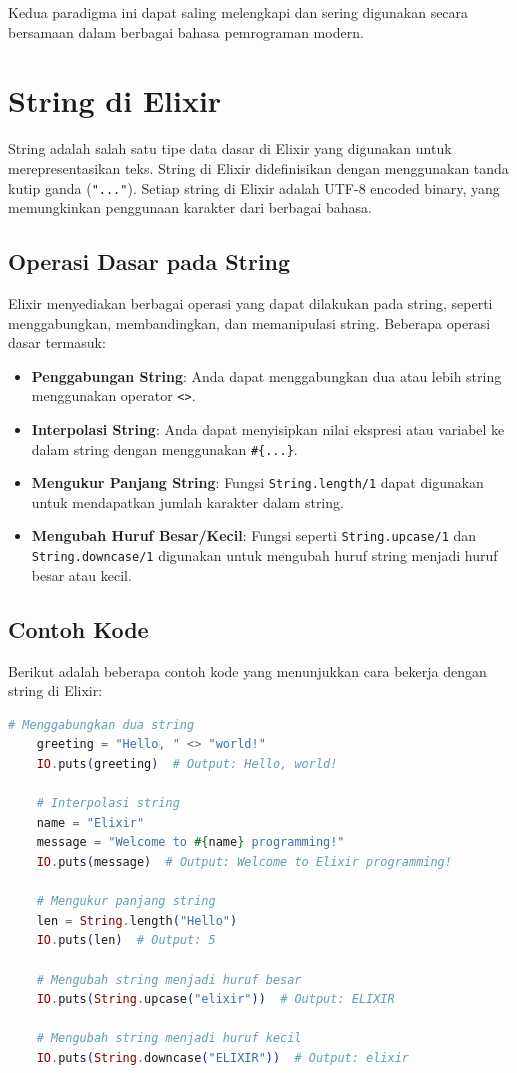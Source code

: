 Kedua paradigma ini dapat saling melengkapi dan sering digunakan secara bersamaan dalam berbagai bahasa pemrograman modern.





\section{String di Elixir}

String adalah salah satu tipe data dasar di Elixir yang digunakan untuk merepresentasikan teks. String di Elixir didefinisikan dengan menggunakan tanda kutip ganda (\texttt{"..."}). Setiap string di Elixir adalah UTF-8 encoded binary, yang memungkinkan penggunaan karakter dari berbagai bahasa.

\subsection{Operasi Dasar pada String}

Elixir menyediakan berbagai operasi yang dapat dilakukan pada string, seperti menggabungkan, membandingkan, dan memanipulasi string. Beberapa operasi dasar termasuk:

\begin{itemize}
	\item \textbf{Penggabungan String}: Anda dapat menggabungkan dua atau lebih string menggunakan operator \texttt{<>}.
	\item \textbf{Interpolasi String}: Anda dapat menyisipkan nilai ekspresi atau variabel ke dalam string dengan menggunakan \texttt{\#\{...\}}.
	\item \textbf{Mengukur Panjang String}: Fungsi \texttt{String.length/1} dapat digunakan untuk mendapatkan jumlah karakter dalam string.
	\item \textbf{Mengubah Huruf Besar/Kecil}: Fungsi seperti \texttt{String.upcase/1} dan \texttt{String.downcase/1} digunakan untuk mengubah huruf string menjadi huruf besar atau kecil.
\end{itemize}

\subsection{Contoh Kode}

Berikut adalah beberapa contoh kode yang menunjukkan cara bekerja dengan string di Elixir:

\begin{lstlisting}[language=Elixir]
	# Menggabungkan dua string
	greeting = "Hello, " <> "world!"
	IO.puts(greeting)  # Output: Hello, world!
	
	# Interpolasi string
	name = "Elixir"
	message = "Welcome to #{name} programming!"
	IO.puts(message)  # Output: Welcome to Elixir programming!
	
	# Mengukur panjang string
	len = String.length("Hello")
	IO.puts(len)  # Output: 5
	
	# Mengubah string menjadi huruf besar
	IO.puts(String.upcase("elixir"))  # Output: ELIXIR
	
	# Mengubah string menjadi huruf kecil
	IO.puts(String.downcase("ELIXIR"))  # Output: elixir
\end{lstlisting}

